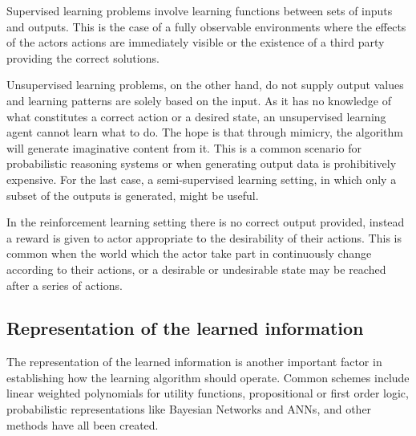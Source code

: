 Supervised learning problems involve learning functions between sets of inputs and outputs. This is the case of a fully observable environments where the effects of the actors actions are immediately visible or the existence of a third party providing the correct solutions.

Unsupervised learning problems, on the other hand, do not supply output values and learning patterns are solely based on the input. As it has no knowledge of what constitutes a correct action or a desired state, an unsupervised learning agent cannot learn what to do. The hope is that through mimicry, the algorithm will generate imaginative content from it. This is a common scenario for probabilistic reasoning systems or when generating output data is prohibitively expensive. For the last case, a semi-supervised learning setting, in which only a subset of the outputs is generated, might be useful.

In the reinforcement learning setting there is no correct output provided, instead a reward is given to actor appropriate to the desirability of their actions. This is common when the world which the actor take part in continuously change according to their actions, or a desirable or undesirable state may be reached after a series of actions.

\subsection{Representation of the learned information}
The representation of the learned information is another important factor in establishing how the learning algorithm should operate. Common schemes include linear weighted polynomials for utility functions, propositional or first order logic, probabilistic representations like Bayesian Networks\cite{Probabilistic_Reasoning} and ANNs\cite{McCulloch1943}, and other methods have all been created.

